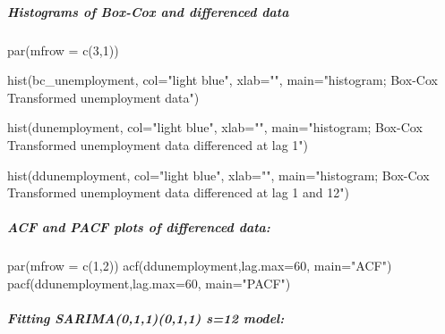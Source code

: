 \documentclass[
  letterpaper,
  DIV=11,
  numbers=noendperiod]{scrartcl}
\let\oldsubparagraph\subparagraph
\renewcommand{\subparagraph}[1]{\oldsubparagraph{#1}\mbox{}}
\newenvironment{Shaded}{\begin{snugshade}}{\end{snugshade}}
\newcommand{\AttributeTok}[1]{\textcolor[rgb]{0.40,0.45,0.13}{#1}}
\newcommand{\DecValTok}[1]{\textcolor[rgb]{0.68,0.00,0.00}{#1}}
\newcommand{\FunctionTok}[1]{\textcolor[rgb]{0.28,0.35,0.67}{#1}}
\newcommand{\NormalTok}[1]{\textcolor[rgb]{0.00,0.23,0.31}{#1}}
\newcommand{\StringTok}[1]{\textcolor[rgb]{0.13,0.47,0.30}{#1}}
\begin{document}
\hypertarget{histograms-of-box-cox-and-differenced-data}{%
\subparagraph{Histograms of Box-Cox and differenced
data}\label{histograms-of-box-cox-and-differenced-data}}

\begin{Shaded}
\begin{Highlighting}[]
\FunctionTok{par}\NormalTok{(}\AttributeTok{mfrow =} \FunctionTok{c}\NormalTok{(}\DecValTok{3}\NormalTok{,}\DecValTok{1}\NormalTok{))}

\FunctionTok{hist}\NormalTok{(bc\_unemployment, }\AttributeTok{col=}\StringTok{"light blue"}\NormalTok{, }\AttributeTok{xlab=}\StringTok{""}\NormalTok{, }\AttributeTok{main=}\StringTok{"histogram; Box{-}Cox Transformed unemployment data"}\NormalTok{)}

\FunctionTok{hist}\NormalTok{(dunemployment, }\AttributeTok{col=}\StringTok{"light blue"}\NormalTok{, }\AttributeTok{xlab=}\StringTok{""}\NormalTok{, }\AttributeTok{main=}\StringTok{"histogram; Box{-}Cox Transformed unemployment data differenced at lag 1"}\NormalTok{)}

\FunctionTok{hist}\NormalTok{(ddunemployment, }\AttributeTok{col=}\StringTok{"light blue"}\NormalTok{, }\AttributeTok{xlab=}\StringTok{""}\NormalTok{, }\AttributeTok{main=}\StringTok{"histogram; Box{-}Cox Transformed unemployment data differenced at lag 1 and 12"}\NormalTok{)}
\end{Highlighting}
\end{Shaded}

\hypertarget{acf-and-pacf-plots-of-differenced-data}{%
\subparagraph{ACF and PACF plots of differenced
data:}\label{acf-and-pacf-plots-of-differenced-data}}

\begin{Shaded}
\begin{Highlighting}[]
\FunctionTok{par}\NormalTok{(}\AttributeTok{mfrow =} \FunctionTok{c}\NormalTok{(}\DecValTok{1}\NormalTok{,}\DecValTok{2}\NormalTok{))}
\FunctionTok{acf}\NormalTok{(ddunemployment,}\AttributeTok{lag.max=}\DecValTok{60}\NormalTok{, }\AttributeTok{main=}\StringTok{"ACF"}\NormalTok{) }
\FunctionTok{pacf}\NormalTok{(ddunemployment,}\AttributeTok{lag.max=}\DecValTok{60}\NormalTok{, }\AttributeTok{main=}\StringTok{"PACF"}\NormalTok{) }
\end{Highlighting}
\end{Shaded}

\hypertarget{fitting-sarima011011-s12-model}{%
\subparagraph{Fitting SARIMA(0,1,1)(0,1,1) s=12
model:}\label{fitting-sarima011011-s12-model}}
\end{document}
